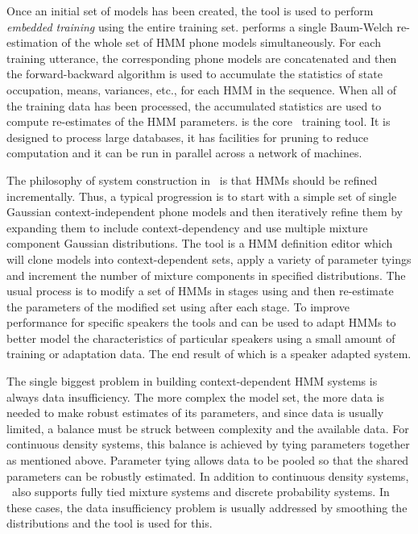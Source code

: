 
Once an initial set of models has been created, the tool 
is used to perform {\em embedded training} using the 
entire
training set.   performs a single Baum-Welch
re-estimation of the whole set of HMM phone models simultaneously.  For each
training utterance, the corresponding phone models are concatenated and then
the forward-backward algorithm is used to accumulate the statistics of state
occupation, means, variances, etc., for each HMM in the sequence.  When
all of the training data has been processed, the accumulated statistics
are used to compute re-estimates of the HMM parameters.   is
the core \HTK\ training tool.  It is designed to process large databases, it has
facilities for pruning to reduce computation and it can be run in parallel 
across a network of machines.

The philosophy of system construction in \HTK\  is that HMMs should be
refined incrementally.  Thus, a typical progression is to start with a
simple set of single Gaussian context-independent phone models and then
iteratively refine them by expanding them to include context-dependency 
and use multiple mixture component Gaussian distributions.
The tool  is a 
HMM definition editor which will clone models
into context-dependent sets, apply a variety of parameter tyings
and increment the number of mixture components in specified distributions.
The usual process is to modify a set of HMMs in stages using 
and then 
re-estimate the parameters of the modified set using 
after each stage.  
To improve performance for specific speakers the tools 
and  can be 
used to adapt HMMs to better model the characteristics of particular 
speakers using a small amount of training or adaptation data.
The end result of which is a speaker adapted system.

The single biggest problem in building context-dependent 
HMM systems is always data
insufficiency.  The more complex the model set, the more data is 
needed to make robust estimates of its parameters, and since data is
usually limited, a balance must be struck between complexity and 
the available data.
For continuous density systems, this balance is achieved by 
tying parameters together as mentioned above.  Parameter tying
allows data to be pooled so that the shared parameters can be robustly
estimated. 
In addition to continuous density systems, \HTK\ also supports
fully tied mixture systems and discrete probability systems.  In these
cases, the data insufficiency problem is usually addressed by smoothing
the distributions and the 
tool  is used for this.

